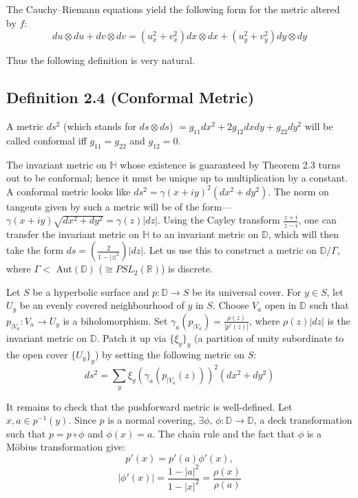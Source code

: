 \documentclass[11pt,a4paper]{article}
\begin{document}

        The Cauchy--Riemann equations yield the following form for the metric altered by $f$: $$du\otimes du + dv\otimes dv = (u_x^2 + v_x^2)dx\otimes dx + (u_y^2 + v_y^2)dy\otimes dy$$


        Thus the following definition is very natural.
        \subsection*{Definition 2.4 (Conformal Metric)} A metric $ds^2$ (which stands for $ds\otimes ds$) $= g_{11}dx^2 + 2g_{12}dxdy + g_{22}dy^2$ will be called conformal iff $g_{11} = g_{22}$ and $g_{12} = 0$.



        The invariant metric on $\mathbb{H}$ whose existence is guaranteed by Theorem 2.3 turns out to be conformal; hence it must be unique up to multiplication by a constant. A conformal metric looks like $ds^2 = \gamma(x+iy)^2(dx^2 + dy^2)$. The norm on tangents given by such a metric will be of the form---$\gamma(x+iy)\sqrt{dx^2 + dy^2} = \gamma(z)|dz|$. Using the Cayley transform $\frac{z+i}{z-i}$, one can transfer the invariant metric on $\mathbb{H}$ to an invariant metric on $\mathbb{D}$, which will then take the form $ds = (\frac{2}{1 -|z|^2})|dz|$. Let us use this to construct a metric on $\mathbb{D}/\Gamma$, where $\Gamma <$ Aut$(\mathbb{D})$ ($\cong PSL_2(\mathbb{R})$) is discrete.

        Let $S$ be a hyperbolic surface and $p: \mathbb{D} \rightarrow S$ be its universal cover. For $y \in S$, let $U_y$ be an evenly covered neighbourhood of $y$ in $S$. Choose $V_a$ open in $\mathbb{D}$ such that $p_{\big|V_a}: V_a \rightarrow U_y$ is a biholomorphism. Set $\gamma_a(p_{\big|V_a}) = \frac{\rho(z)}{|p'(z)|}$, where $\rho(z)|dz|$ is the invariant metric on $\mathbb{D}$. Patch it up via $\{\xi_y\}_y$ (a partition of unity subordinate to the open cover $\{U_y\}_y$) by setting the following metric on $S$:
        $$ds^2 = \sum_{y}{\xi_y(\gamma_a(p_{\big|V_a}(z)))^2(dx^2 +dy^2)}$$

        It remains to check that the pushforward metric is well-defined. Let $x,a \in p^{-1}(y)$. Since $p$ is a normal covering, $\exists \phi$, $\phi: \mathbb{D} \rightarrow \mathbb{D}$, a deck transformation such that $p = p \circ \phi$ and $\phi(x) = a$. The chain rule and the fact that $\phi$ is a M\"obius transformation give:
        $$p'(x) = p'(a)\phi'(x),$$
        $$|\phi'(x)| = \frac{1 - |a|^2}{1 - |x|^2} = \frac{\rho(x)}{\rho(a)}$$
\end{document}
